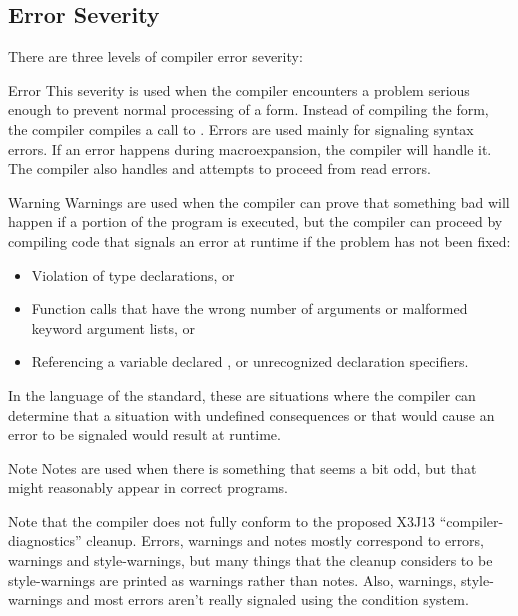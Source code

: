 \subsection{Error Severity}
\label{error-severity}

There are three levels of compiler error severity:

\begin{Lentry}  
\item[Error] This severity is used when the compiler encounters a
  problem serious enough to prevent normal processing of a form.
  Instead of compiling the form, the compiler compiles a call to
  .  Errors are used mainly for signaling syntax errors.
  If an error happens during macroexpansion, the compiler will handle
  it.  The compiler also handles and attempts to proceed from read
  errors.
  
\item[Warning] Warnings are used when the compiler can prove that
  something bad will happen if a portion of the program is executed,
  but the compiler can proceed by compiling code that signals an error
  at runtime if the problem has not been fixed:
  \begin{itemize}
  
  \item Violation of type declarations, or
  
  \item Function calls that have the wrong number of arguments or
    malformed keyword argument lists, or
  
  \item Referencing a variable declared , or unrecognized
    declaration specifiers.
  \end{itemize}
  
  In the language of the \clisp{} standard, these are situations where
  the compiler can determine that a situation with undefined
  consequences or that would cause an error to be signaled would
  result at runtime.
  
\item[Note] Notes are used when there is something that seems a bit
  odd, but that might reasonably appear in correct programs.
\end{Lentry}

Note that the compiler does not fully conform to the proposed X3J13
``compiler-diagnostics'' cleanup.  Errors, warnings and notes mostly
correspond to errors, warnings and style-warnings, but many things
that the cleanup considers to be style-warnings are printed as
warnings rather than notes.  Also, warnings, style-warnings and most
errors aren't really signaled using the condition system.


